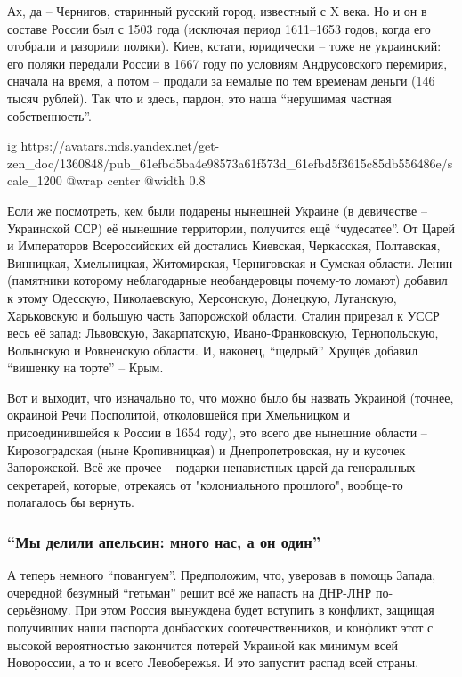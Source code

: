 Ах, да – Чернигов, старинный русский город, известный с X века. Но и он в
составе России был с 1503 года (исключая период 1611–1653 годов, когда его
отобрали и разорили поляки). Киев, кстати, юридически – тоже не украинский: его
поляки передали России в 1667 году по условиям Андрусовского перемирия, сначала
на время, а потом – продали за немалые по тем временам деньги (146 тысяч
рублей). Так что и здесь, пардон, это наша \enquote{нерушимая частная собственность}.

\ifcmt
  ig https://avatars.mds.yandex.net/get-zen_doc/1360848/pub_61efbd5ba4e98573a61f573d_61efbd5f3615c85db556486e/scale_1200
	@wrap center
	@width 0.8
\fi

Если же посмотреть, кем были подарены нынешней Украине (в девичестве –
Украинской ССР) её нынешние территории, получится ещё \enquote{чудесатее}. От
Царей и Императоров Всероссийских ей достались Киевская, Черкасская,
Полтавская, Винницкая, Хмельницкая, Житомирская, Черниговская и Сумская
области. Ленин (памятники которому неблагодарные необандеровцы почему-то
ломают) добавил к этому Одесскую, Николаевскую, Херсонскую, Донецкую,
Луганскую, Харьковскую и большую часть Запорожской области. Сталин прирезал к
УССР весь её запад: Львовскую, Закарпатскую, Ивано-Франковскую, Тернопольскую,
Волынскую и Ровненскую области. И, наконец, \enquote{щедрый} Хрущёв добавил
\enquote{вишенку на торте} – Крым.

Вот и выходит, что изначально то, что можно было бы назвать Украиной (точнее,
окраиной Речи Посполитой, отколовшейся при Хмельницком и присоединившейся к
России в 1654 году), это всего две нынешние области – Кировоградская (ныне
Кропивницкая) и Днепропетровская, ну и кусочек Запорожской. Всё же прочее –
подарки ненавистных царей да генеральных секретарей, которые, отрекаясь от
"колониального прошлого", вообще-то полагалось бы вернуть.

\subsubsection{\enquote{Мы делили апельсин: много нас, а он один}}

А теперь немного \enquote{повангуем}. Предположим, что, уверовав в помощь Запада,
очередной безумный \enquote{гетьман} решит всё же напасть на ДНР-ЛНР по-серьёзному. При
этом Россия вынуждена будет вступить в конфликт, защищая получивших наши
паспорта донбасских соотечественников, и конфликт этот с высокой вероятностью
закончится потерей Украиной как минимум всей Новороссии, а то и всего
Левобережья. И это запустит распад всей страны.

